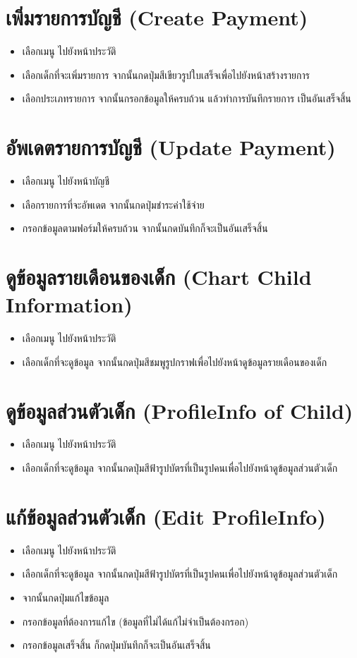 \section{เพิ่มรายการบัญชี (Create Payment)}
\begin{itemize}
    \item เลือกเมนู ไปยังหน้าประวัติ
    \item เลือกเด็กที่จะเพิ่มรายการ จากนั้นกดปุ่มสีเขียวรูปใบเสร็จเพื่อไปยังหน้าสร้างรายการ
    \item เลือกประเภทรายการ จากนั้นกรอกข้อมูลให้ครบถ้วน แล้วทำการบันทึกรายการ เป็นอันเสร็จสิ้น
\end{itemize}

\section{อัพเดตรายการบัญชี (Update Payment)}
\begin{itemize}
    \item เลือกเมนู ไปยังหน้าบัญชี
    \item เลือกรายการที่จะอัพเดต จากนั้นกดปุ่มชำระค่าใช้จ่าย
    \item กรอกข้อมูลตามฟอร์มให้ครบถ้วน จากนั้นกดบันทึกก็จะเป็นอันเสร็จสิ้น
\end{itemize}

\section{ดูข้อมูลรายเดือนของเด็ก (Chart Child Information)}
\begin{itemize}
    \item เลือกเมนู ไปยังหน้าประวัติ
    \item เลือกเด็กที่จะดูข้อมูล จากนั้นกดปุ่มสีชมพูรูปกราฟเพื่อไปยังหน้าดูข้อมูลรายเดือนของเด็ก
\end{itemize}
\section{ดูข้อมูลส่วนตัวเด็ก (ProfileInfo of Child)}
\begin{itemize}
    \item เลือกเมนู ไปยังหน้าประวัติ
    \item เลือกเด็กที่จะดูข้อมูล จากนั้นกดปุ่มสีฟ้ารูปบัตรที่เป็นรูปคนเพื่อไปยังหน้าดูข้อมูลส่วนตัวเด็ก
\end{itemize}

\section{แก้ข้อมูลส่วนตัวเด็ก (Edit ProfileInfo)}
\begin{itemize}
    \item เลือกเมนู ไปยังหน้าประวัติ
    \item เลือกเด็กที่จะดูข้อมูล จากนั้นกดปุ่มสีฟ้ารูปบัตรที่เป็นรูปคนเพื่อไปยังหน้าดูข้อมูลส่วนตัวเด็ก
    \item จากนั้นกดปุ่มแก้ไขข้อมูล
    \item กรอกข้อมูลที่ต้องการแก้ไข (ข้อมูลที่ไม่ได้แก้ไม่จำเป็นต้องกรอก)
    \item กรอกข้อมูลเสร็จสิ้น ก็กดปุ่มบันทึกก็จะเป็นอันเสร็จสิ้น
\end{itemize}
